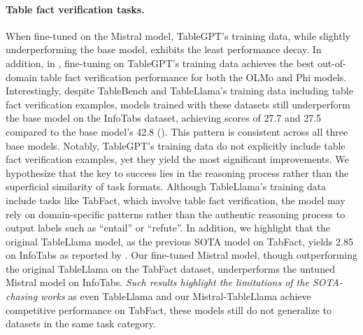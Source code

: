 \documentclass[11pt]{article}
\begin{document}
\paragraph{Table fact verification tasks.}
When fine-tuned on the Mistral model, TableGPT's training data, while slightly underperforming the base model, exhibits the least performance decay.
In addition, in , fine-tuning on TableGPT's training data achieves the best out-of-domain table fact verification performance for both the OLMo and Phi models.
Interestingly, despite TableBench and TableLlama's training data including table fact verification examples, models trained with these datasets still underperform the base model on the InfoTabs dataset, achieving scores of 27.7 and 27.5 compared to the base model's 42.8 (). This pattern is consistent across all three base models.
Notably, TableGPT's training data do not explicitly include table fact verification examples, yet they yield the most significant improvements. 
We hypothesize that the key to success lies in the reasoning process rather than the superficial similarity of task formats. 
Although TableLlama's training data include tasks like TabFact, which involve table fact verification, the model may rely on domain-specific patterns rather than the authentic reasoning process to output labels such as ``entail'' or ``refute''.
In addition, we highlight that the original TableLlama model, as the previous SOTA model on TabFact, yields 2.85 on InfoTabs as reported by \citet{zheng2024multimodal}.
Our fine-tuned Mistral model, though outperforming the original TableLlama on the TabFact dataset, underperforms the untuned Mistral model on InfoTabs.
\textit{Such results highlight the limitations of the SOTA-chasing works} as even TableLlama and our Mistral-TableLlama achieve competitive performance on TabFact, these models still do not generalize to datasets in the same task category.
\end{document}
